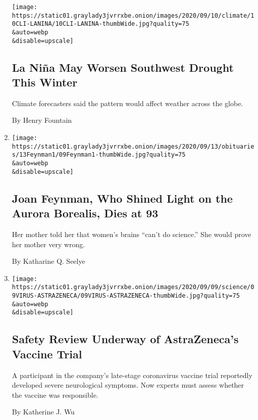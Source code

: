 \begin{enumerate}
  \texttt{[image: https://static01.graylady3jvrrxbe.onion/images/2020/09/10/climate/10CLI-LANINA/10CLI-LANINA-thumbWide.jpg?quality=75\\\&auto=webp\\\&disable=upscale]}

  \hypertarget{la-niuxf1a-may-worsen-southwest-drought-this-winter}{%
  \subsection{La Niña May Worsen Southwest Drought This
  Winter}\label{la-niuxf1a-may-worsen-southwest-drought-this-winter}}

  Climate forecasters said the pattern would affect weather across the
  globe.

  By Henry Fountain
\item
  \href{/2020/09/10/science/joan-feynman-dead.html}{}

  \texttt{[image: https://static01.graylady3jvrrxbe.onion/images/2020/09/13/obituaries/13Feynman1/09Feynman1-thumbWide.jpg?quality=75\\\&auto=webp\\\&disable=upscale]}

  \hypertarget{joan-feynman-who-shined-light-on-the-aurora-borealis-dies-at-93}{%
  \subsection{Joan Feynman, Who Shined Light on the Aurora Borealis,
  Dies at
  93}\label{joan-feynman-who-shined-light-on-the-aurora-borealis-dies-at-93}}

  Her mother told her that women's brains ``can't do science.'' She
  would prove her mother very wrong.

  By Katharine Q. Seelye
\item
  \href{/2020/09/10/health/covid-astrazeneca-vaccine-trans.html}{}

  \texttt{[image: https://static01.graylady3jvrrxbe.onion/images/2020/09/09/science/09VIRUS-ASTRAZENECA/09VIRUS-ASTRAZENECA-thumbWide.jpg?quality=75\\\&auto=webp\\\&disable=upscale]}

  \hypertarget{safety-review-underway-of-astrazenecas-vaccine-trial}{%
  \subsection{Safety Review Underway of AstraZeneca's Vaccine
  Trial}\label{safety-review-underway-of-astrazenecas-vaccine-trial}}

  A participant in the company's late-stage coronavirus vaccine trial
  reportedly developed severe neurological symptoms. Now experts must
  assess whether the vaccine was responsible.

  By Katherine J. Wu
\end{enumerate}

